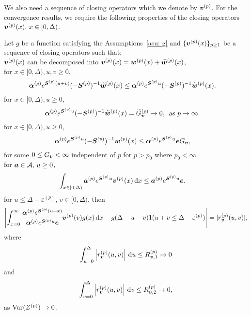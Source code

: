 We also need a sequence of closing operators which we denote by \({\boldsymbol v}^{(p)}\). For the convergence results, we require the following properties of the closing operators \({\boldsymbol v}^{(p)}(x),\, x \in[0,\Delta)\).
\begin{property}\label{properties: some props}
	Let \(g\) be a function satisfying the Assumptions~\ref{asu: g} and \(\{\boldsymbol v^{(p)}(x)\}_{p\geq 1}\) be a sequence of closing operators such that;\\
	\subproperty \label{properties: -3} \(\boldsymbol v^{(p)}(x)\) can be decomposed into \(\boldsymbol v^{(p)}(x)=\boldsymbol w^{(p)}(x) + \widetilde{\boldsymbol w}^{(p)}(x)\), \\
	\subproperty \label{properties: -1} for \(x\in[0,\Delta),u,v\geq 0\). 
        \begin{align*}
        		\boldsymbol \alpha^{(p)} e^{\boldsymbol S^{(p)}(u+v)}(-\boldsymbol S^{(p)})^{-1} \widetilde{\boldsymbol w}^{(p)}(x) &\leq \boldsymbol \alpha^{(p)} e^{\boldsymbol S^{(p)}u}(-\boldsymbol S^{(p)})^{-1} \widetilde{\boldsymbol w}^{(p)}(x).
		\end{align*}
	\subproperty \label{properties: 0} for \(x\in[0,\Delta),u\geq 0\),
		\begin{align*}
			\boldsymbol \alpha^{(p)} e^{\boldsymbol S^{(p)}u}(-\boldsymbol S^{(p)})^{-1} \widetilde{\boldsymbol w}^{(p)}(x) &=\widetilde G_{\boldsymbol v}^{(p)} \to 0,\, \mbox{ as }p \to \infty.  
		\end{align*}
	\subproperty \label{properties: 1} for \(x\in[0,\Delta),u\geq 0\),  
        \begin{align*}
        		\boldsymbol \alpha^{(p)} e^{\boldsymbol S^{(p)}u}(-\boldsymbol S^{(p)})^{-1} \boldsymbol w^{(p)}(x) &\leq \boldsymbol \alpha^{(p)} e^{\boldsymbol S^{(p)}u} \boldsymbol e G_{\boldsymbol v},
	\end{align*}
	for some \(0\leq G_{\boldsymbol v}<\infty\) independent of \(p\) for \(p>p_0\) where \(p_0<\infty\). \\
	\subproperty \label{properties: -2} for \(\boldsymbol a \in\mathcal A,\,u\geq 0\),  
	\begin{align*}
			\int_{x\in[0,\Delta)}\boldsymbol a^{(p)} e^{\boldsymbol S^{(p)}u} {\boldsymbol v}^{(p)}(x) \, \mathrm{d} x&\leq \boldsymbol a^{(p)} e^{\boldsymbol S^{(p)}u} \boldsymbol e.
	\end{align*}
	\subproperty \label{properties: 2} for \(u\leq \Delta-\varepsilon^{(p)}\), \(v\in[0,\Delta)\), then
	\[\left|\int_{x=0}^\infty \cfrac{\boldsymbol \alpha^{(p)} e^{\boldsymbol{S}^{(p)}(u+x)} }{\boldsymbol \alpha^{(p)} e^{\boldsymbol{S}^{(p)}u} \boldsymbol e} {\boldsymbol v}^{(p)}(v)g(x)\, \mathrm{d} x -g(\Delta-u-v) 1(u+v\leq\Delta-\varepsilon^{(p)})\right| =  |r_{\boldsymbol v}^{(p)}(u,v)|,\]
	where 
	\[ \int_{u=0}^{\Delta}\left| r_{\boldsymbol v}^{(p)}(u,v)\right| \, \mathrm{d} u  \leq R_{{\boldsymbol v},1}^{(p)} \to 0\]
	and 
	\[ \int_{v=0}^{\Delta}\left| r_{\boldsymbol v}^{(p)}(u,v)\right| \, \mathrm{d} v  \leq R_{{\boldsymbol v},2}^{(p)} \to 0,\]
	as \(\mathrm{Var}(Z^{(p)})\to 0\). 
\end{property}

